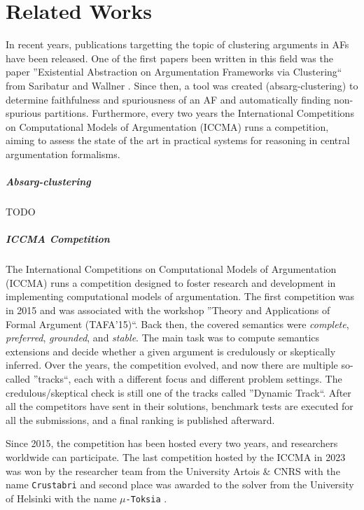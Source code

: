 \chapter{Related Works}
In recent years, publications targetting the topic of clustering arguments in AFs have been released. One of the first papers been written in this field was the paper ''Existential Abstraction on Argumentation Frameworks via Clustering`` from Saribatur and Wallner \cite{DBLP:conf/kr/SaribaturW21}. Since then, a tool was created (absarg-clustering)\cite{GitHub:repoRelatedTool} to determine faithfulness and spuriousness of an AF and automatically finding non-spurious partitions. Furthermore, every two years the International Competitions on Computational Models of Argumentation (ICCMA) \cite{COMP:ICCMA2023} runs a competition, aiming to assess the state of the art in practical systems for reasoning in central argumentation formalisms.

\paragraph{Absarg-clustering} TODO

\paragraph{ICCMA Competition} The International Competitions on Computational Models of Argumentation (ICCMA) runs a competition designed to foster research and development in implementing computational models of argumentation. The first competition was in 2015 and was associated with the workshop ''Theory and Applications of Formal Argument (TAFA'15)``. Back then, the covered semantics were \emph{complete}, \emph{preferred}, \emph{grounded}, and \emph{stable}. The main task was to compute semantics extensions and decide whether a given argument is credulously or skeptically inferred. Over the years, the competition evolved, and now there are multiple so-called ''tracks``, each with a different focus and different problem settings. The credulous/skeptical check is still one of the tracks called ''Dynamic Track``. After all the competitors have sent in their solutions, benchmark tests are executed for all the submissions, and a final ranking is published afterward.

Since 2015, the competition has been hosted every two years, and researchers worldwide can participate. The last competition hosted by the ICCMA in 2023 was won by the researcher team from the University Artois \& CNRS with the name \texttt{Crustabri} \cite{GitHub:repoWinnerICCMA2023} and second place was awarded to the solver from the University of Helsinki with the name \texttt{$\mu$-Toksia} \cite{DBLP:conf/kr/NiskanenJ20a}. 





